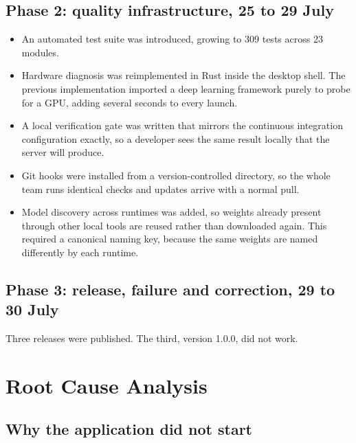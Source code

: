 \documentclass[11pt,a4paper]{article}
\begin{document}
\subsection{Phase 2: quality infrastructure, 25 to 29 July}

\begin{itemize}[leftmargin=*]
  \item An automated test suite was introduced, growing to 309 tests across 23
        modules.
  \item Hardware diagnosis was reimplemented in Rust inside the desktop shell.
        The previous implementation imported a deep learning framework purely to
        probe for a GPU, adding several seconds to every launch.
  \item A local verification gate was written that mirrors the continuous
        integration configuration exactly, so a developer sees the same result
        locally that the server will produce.
  \item Git hooks were installed from a version-controlled directory, so the
        whole team runs identical checks and updates arrive with a normal pull.
  \item Model discovery across runtimes was added, so weights already present
        through other local tools are reused rather than downloaded again. This
        required a canonical naming key, because the same weights are named
        differently by each runtime.
\end{itemize}

\subsection{Phase 3: release, failure and correction, 29 to 30 July}

Three releases were published. The third, version 1.0.0, did not work.


\section{Root Cause Analysis}

\subsection{Why the application did not start}
\end{document}
